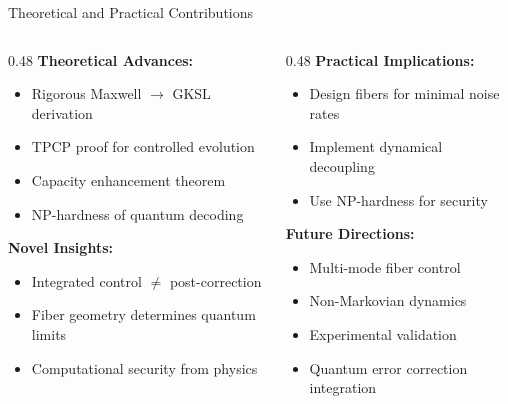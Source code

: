 \documentclass[aspectratio=169,12pt]{beamer}
\begin{document}
\begin{frame}{Theoretical and Practical Contributions}
\begin{columns}
\begin{column}{0.48\textwidth}
\textbf{Theoretical Advances:}
\begin{itemize}
\item Rigorous Maxwell $\to$ GKSL derivation
\item TPCP proof for controlled evolution
\item Capacity enhancement theorem
\item NP-hardness of quantum decoding
\end{itemize}

\vspace{0.3cm}

\textbf{Novel Insights:}
\begin{itemize}
\item Integrated control $\neq$ post-correction
\item Fiber geometry determines quantum limits
\item Computational security from physics
\end{itemize}
\end{column}

\begin{column}{0.48\textwidth}
\textbf{Practical Implications:}
\begin{itemize}
\item Design fibers for minimal noise rates
\item Implement dynamical decoupling
\item Use NP-hardness for security
\end{itemize}

\vspace{0.3cm}

\textbf{Future Directions:}
\begin{itemize}
\item Multi-mode fiber control
\item Non-Markovian dynamics
\item Experimental validation
\item Quantum error correction integration
\end{itemize}
\end{column}
\end{columns}
\end{frame}

\end{document}
